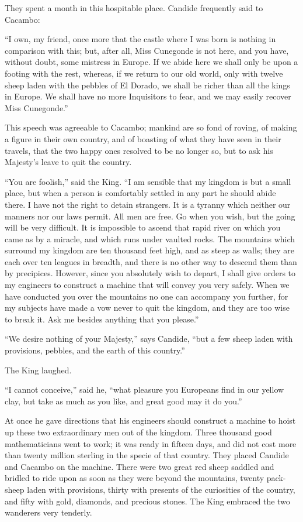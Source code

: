 They spent a month in this hospitable place. Candide frequently said to Cacambo:

``I own, my friend, once more that the castle where I was born is nothing in comparison with this; but, after all, Miss Cunegonde is not here, and you have, without doubt, some mistress in Europe. If we abide here we shall only be upon a footing with the rest, whereas, if we return to our old world, only with twelve sheep laden with the pebbles of El Dorado, we shall be richer than all the kings in Europe. We shall have no more Inquisitors to fear, and we may easily recover Miss Cunegonde.''

This speech was agreeable to Cacambo; mankind are so fond of roving, of making a figure in their own country, and of boasting of what they have seen in their travels, that the two happy ones resolved to be no longer so, but to ask his Majesty's leave to quit the country.

``You are foolish,'' said the King. ``I am sensible that my kingdom is but a small place, but when a person is comfortably settled in any part he should abide there. I have not the right to detain strangers. It is a tyranny which neither our manners nor our laws permit. All men are free. Go when you wish, but the going will be very difficult. It is impossible to ascend that rapid river on which you came as by a miracle, and which runs under vaulted rocks. The mountains which surround my kingdom are ten thousand feet high, and as steep as walls; they are each over ten leagues in breadth, and there is no other way to descend them than by precipices. However, since you absolutely wish to depart, I shall give orders to my engineers to construct a machine that will convey you very safely. When we have conducted you over the mountains no one can accompany you further, for my subjects have made a vow never to quit the kingdom, and they are too wise to break it. Ask me besides anything that you please.''

``We desire nothing of your Majesty,'' says Candide, ``but a few sheep laden with provisions, pebbles, and the earth of this country.''

The King laughed.

``I cannot conceive,'' said he, ``what pleasure you Europeans find in our yellow clay, but take as much as you like, and great good may it do you.''

At once he gave directions that his engineers should construct a machine to hoist up these two extraordinary men out of the kingdom. Three thousand good mathematicians went to work; it was ready in fifteen days, and did not cost more than twenty million sterling in the specie of that country. They placed Candide and Cacambo on the machine. There were two great red sheep saddled and bridled to ride upon as soon as they were beyond the mountains, twenty pack-sheep laden with provisions, thirty with presents of the curiosities of the country, and fifty with gold, diamonds, and precious stones. The King embraced the two wanderers very tenderly.

